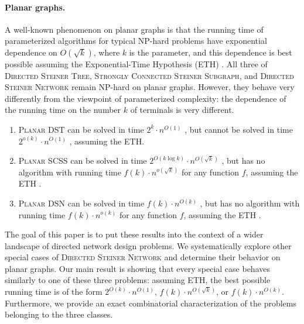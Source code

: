 \documentclass[a4paper,11pt]{article}
\theoremstyle{plain}
\newtheorem{identification rule}{Identification Rule}
\theoremstyle{definition}
\theoremstyle{remark}
\begin{document}
\paragraph{Planar graphs.} A well-known phenomenon on planar graphs is that the running time of parameterized algorithms for typical NP-hard problems have exponential dependence on $O(\sqrt{k})$, where $k$ is the parameter, and this dependence is best possible assuming the Exponential-Time Hypothesis (ETH)
\cite{DBLP:conf/focs/MarxPP18,ChitnisFHM20,DBLP:conf/focs/FominLMPPS16,DBLP:journals/talg/MarxP22,DBLP:conf/soda/KleinM14,DBLP:conf/icalp/KleinM12,DBLP:conf/icalp/Marx12,DBLP:conf/fsttcs/LokshtanovSW12,DBLP:journals/algorithmica/Verdiere17,DBLP:conf/stoc/Nederlof20a,10.5555/2815661}. All three of \textsc{Directed Steiner Tree},  \textsc{Strongly Connected Steiner Subgraph}, 
and \textsc{Directed Steiner Network} remain NP-hard on planar graphs. However, they behave very differently from the viewpoint of parameterized complexity: the dependence of the running time on the number $k$ of terminals is very different.
\medskip

\begin{mdframed}[style=highlight,frametitle={Our starting point}] 
     
    \begin{enumerate}    
\item \textsc{Planar DST} can be solved in time $2^k\cdot n^{O(1)}$ \cite{DBLP:conf/stoc/BjorklundHKK07}, but cannot be solved in time $2^{o(k)}\cdot n^{O(1)}$ \cite{DBLP:conf/focs/MarxPP18}, assuming the ETH.
\item \textsc{Planar SCSS} can be solved in time $2^{O(k\log k)}\cdot n^{O(\sqrt{k})}$ \cite{ChitnisFHM20}, but has no algorithm with running time $f(k) \cdot n^{o(\sqrt{k})}$ for any function $f$, assuming the ETH \cite{ChitnisFHM20}.
\item \textsc{Planar DSN} can be solved in time $f(k) \cdot n^{O({k})}$ \cite{eiben_et_al}, but has no algorithm with running time $f(k) \cdot n^{o({k})}$ for any function $f$, assuming the ETH \cite{ChitnisFHM20}.
\end{enumerate}
\end{mdframed}
\medskip

The goal of this paper is to put these results into the context of a wider landscape of directed network design problems. We systematically explore other special cases of  \textsc{Directed Steiner Network} and determine their behavior on planar graphs. Our main result is showing that every special case behaves similarly to one of these three problems: assuming ETH, the best possible running time is of the form $2^{O(k)}\cdot n^{O(1)}$, $f(k) \cdot n^{O(\sqrt{k})}$, or $f(k)\cdot n^{O(k)}$. Furthermore, we provide an exact combinatorial characterization of the problems belonging to the three classes.
\clearpage
\end{document}

